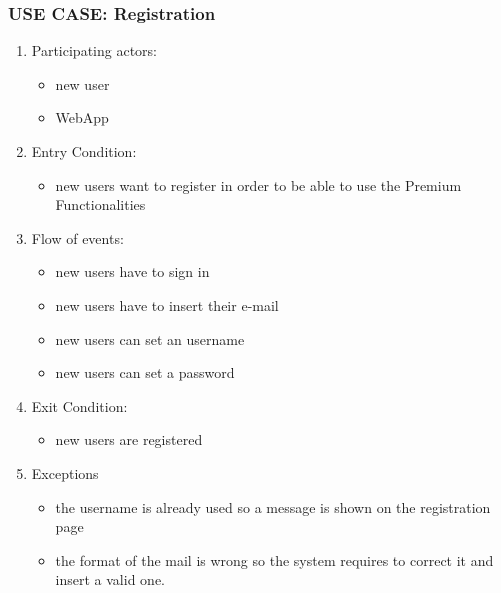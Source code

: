\documentclass{article}
\begin{document}
\subsubsection{\textbf{USE CASE}: Registration}
\begin{enumerate}
\item Participating actors: 
\begin{itemize}
    \item new user
    \item WebApp
\end{itemize}
\item Entry Condition: 
\begin{itemize}
    \item new users want to register in order to be able to use the Premium Functionalities
\end{itemize}
\item Flow of events: 
\begin{itemize}
    \item new users have to sign in
    \item new users have to insert their e-mail
    \item new users can set an username
    \item new users can set a password
\end{itemize}
\item Exit Condition: 
\begin{itemize}
    \item new users are registered
\end{itemize}
\item Exceptions
\begin{itemize}
    \item the username is already used so a message is shown on the registration page
    \item the format of the mail is wrong so the system requires to correct it and insert a valid one.
\end{itemize}
\end{enumerate}
\end{document}
